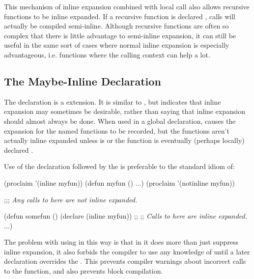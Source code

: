 This mechanism of inline expansion combined with local call also
allows recursive functions to be inline expanded.  If a recursive
function is declared , calls will actually be compiled
semi-inline.  Although recursive functions are often so complex that
there is little advantage to semi-inline expansion, it can still be
useful in the same sort of cases where normal inline expansion is
especially advantageous, i.e. functions where the calling context can
help a lot.


\subsection{The Maybe-Inline Declaration}
\label{maybe-inline-declaration}

The  declaration is a \cmucl{}
extension.  It is similar to , but indicates that inline
expansion may sometimes be desirable, rather than saying that inline
expansion should almost always be done.  When used in a global
declaration,  causes the expansion for
the named functions to be recorded, but the functions aren't actually
inline expanded unless  is  or the function is
eventually (perhaps locally) declared .

Use of the  declaration followed by the
 is preferable to the standard idiom of:
\begin{lisp}
(proclaim '(inline myfun))
(defun myfun () ...)
(proclaim '(notinline myfun))

;;; \textit{Any calls to  here are not inline expanded.}

(defun somefun ()
  (declare (inline myfun))
  ;;
  ;; \textit{Calls to  here are inline expanded.}
  ...)
\end{lisp}
The problem with using  in this way is that in
\clisp{} it does more than just suppress inline expansion, it also
forbids the compiler to use any knowledge of  until a
later  declaration overrides the .  This
prevents compiler warnings about incorrect calls to the function, and
also prevents block compilation.

